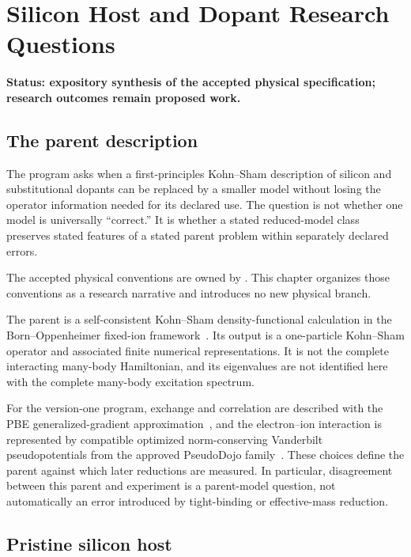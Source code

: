 \chapter{Silicon Host and Dopant Research Questions}
\label{ch:physical-problem}

\textbf{Status: expository synthesis of the accepted physical specification;
research outcomes remain proposed work.}

\section{The parent description}

The program asks when a first-principles Kohn--Sham description of silicon and
substitutional dopants can be replaced by a smaller model without losing the
operator information needed for its declared use. The question is not whether
one model is universally ``correct.'' It is whether a stated reduced-model
class preserves stated features of a stated parent problem within separately
declared errors.

The accepted physical conventions are owned by
. This chapter
organizes those conventions as a research narrative and introduces no new
physical branch.

The parent is a self-consistent Kohn--Sham density-functional calculation in
the Born--Oppenheimer fixed-ion framework~\cite{hohenberg1964,kohn1965}. Its
output is a one-particle Kohn--Sham operator and associated finite numerical
representations. It is not the complete interacting many-body Hamiltonian, and
its eigenvalues are not identified here with the complete many-body excitation
spectrum.

For the version-one program, exchange and correlation are described with the
PBE generalized-gradient approximation~\cite{perdew1996}, and the
electron--ion interaction is represented by compatible optimized
norm-conserving Vanderbilt pseudopotentials from the approved PseudoDojo
family~\cite{hamann2013,vansetten2018}. These choices define the parent against
which later reductions are measured. In particular, disagreement between this
parent and experiment is a parent-model question, not automatically an error
introduced by tight-binding or effective-mass reduction.

\section{Pristine silicon host}

